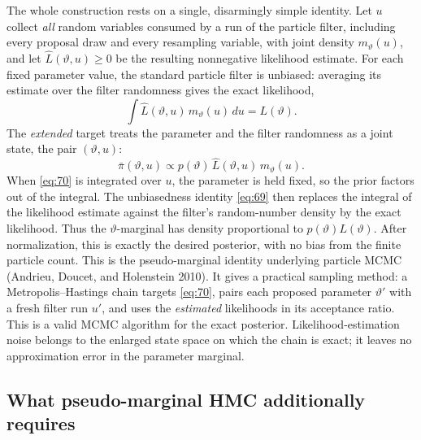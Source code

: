 \documentclass[11pt]{article}
\begin{document}
The whole construction rests on a single, disarmingly simple identity. Let $u$ collect \emph{all} random variables consumed by a run of the particle filter, including every proposal draw and every resampling variable, with joint density $m_\vartheta(u)$, and let
$\widehat L(\vartheta,u)\geq 0$ be the resulting nonnegative likelihood estimate. For each fixed parameter value, the standard particle filter is unbiased: averaging its estimate over the filter randomness gives the exact likelihood,
\begin{equation}\label{eq:69}
 \int \widehat L(\vartheta,u)\,m_\vartheta(u)\,du = L(\vartheta).
\end{equation}
The \emph{extended} target treats the parameter and the filter randomness as a joint state, the pair $(\vartheta,u)$:
\begin{equation}\label{eq:70}
 \bar\pi(\vartheta,u) \propto p(\vartheta)\,\widehat L(\vartheta,u)\,m_\vartheta(u).
\end{equation}
When \eqref{eq:70} is integrated over $u$, the parameter is held fixed, so the prior factors out of the integral. The unbiasedness identity \eqref{eq:69} then replaces the integral of the likelihood estimate against the filter's random-number density by the exact likelihood. Thus the $\vartheta$-marginal has density proportional to $p(\vartheta)L(\vartheta)$. After normalization, this is exactly the desired posterior, with no bias from the finite particle count. This is the pseudo-marginal identity underlying particle MCMC (Andrieu, Doucet, and
Holenstein 2010). It gives a practical sampling method: a Metropolis--Hastings chain targets \eqref{eq:70}, pairs each proposed parameter $\vartheta'$ with a fresh filter run $u'$, and uses the \emph{estimated} likelihoods in its acceptance ratio. This is a valid MCMC algorithm for the exact posterior. Likelihood-estimation noise belongs to the enlarged state space on which the chain is exact; it leaves no approximation error in the parameter marginal.

\subsection{What pseudo-marginal HMC additionally requires}\label{sec:pmhmc}
\end{document}
